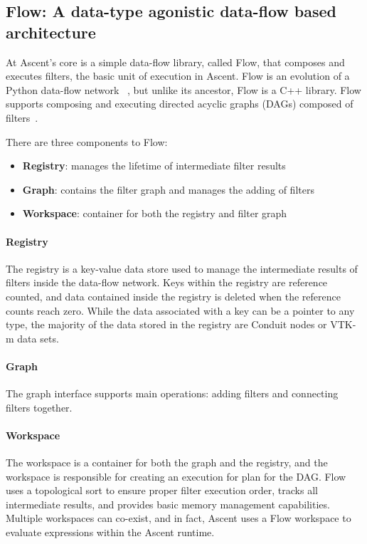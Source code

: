 \subsection{Flow: A data-type agonistic data-flow based architecture}
At Ascent's core is a simple data-flow library, called Flow, that
composes and executes filters, the basic unit of execution in Ascent.
%
Flow is an evolution of a Python data-flow network
~\cite{flow_reference}, but unlike its ancestor, Flow is a C++
library.
%
Flow supports composing and executing directed acyclic graphs
(DAGs) composed of filters~\cite{LarsenAscent}.

There are three components to Flow:
\begin{itemize}
  \item \textbf{Registry}: manages the lifetime of intermediate filter results
  \item \textbf{Graph}: contains the filter graph and manages the adding of filters
  \item \textbf{Workspace}: container for both the registry and filter graph
\end{itemize}

\paragraph{Registry}
The registry is a key-value data store used to manage the intermediate
results of filters inside the data-flow network.
%
Keys within the registry are reference counted, and data contained
inside the registry is deleted when the reference counts reach zero.
%
While the data associated with a key can be a pointer to any type,
the majority of the data stored in the registry are Conduit nodes
or VTK-m data sets.

\paragraph{Graph}
The graph interface supports main operations: adding filters
and connecting filters together.
%

\paragraph{Workspace}
The workspace is a container for both the graph and the registry,
and the workspace is responsible for creating an execution for plan
for the DAG.
%
Flow uses a topological sort to ensure proper filter execution order,
tracks all intermediate results, and provides basic memory management capabilities.
%
Multiple workspaces can co-exist, and in fact, Ascent uses a Flow workspace
to evaluate expressions within the Ascent runtime.

